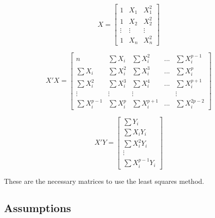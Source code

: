  
 
 $$X=
 \left[
 \begin{array}{ccc}
 	1 &X_1	& X_1^2\\ 
 	1 & X_2 & X_2^2	\\
 	\vdots & \vdots & \vdots \\
 	1 & X_n& X_n^2
 \end{array}
 \right]
 $$
 
 $$X'X=
 \left[
 \begin{array}{ccccc}
 	n &\sum X_i	& \sum X_i^2 & ... &\sum X_i^{p-1}\\ 
 	\sum X_i & \sum X_i^2 & \sum X_i^3&...& \sum X_i^p	\\
 	\sum X_i^2 & \sum X_i^3 & \sum X_i^4 & ... & \sum X_i^{p+1}\\
 	\vdots&\vdots&\vdots& & \vdots	\\
 	\sum X_i^{p-1} &\sum X_i^p& \sum X_i^{p+1} & ... & \sum X_i^{2p-2}
 \end{array}
 \right]
 $$
 
 $$X' Y=
 \left[
 \begin{array}{c}
 	\sum Y_i\\ 
 	\sum X_i Y_i	\\
 	\sum X_i^2 Y_i \\
 	\vdots	\\
 	\sum X_i^{p-1} Y_i
 \end{array}
 \right]
 $$
 
 \noindent These are the necessary matrices to use the least squares method.

	\subsection{Assumptions}
	